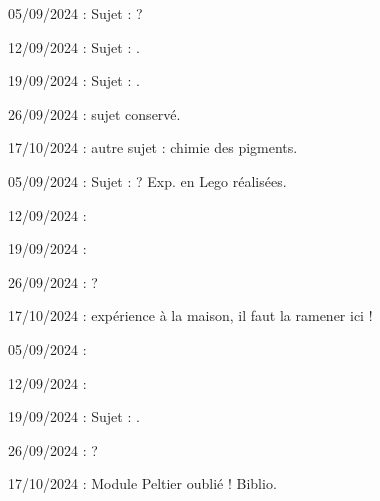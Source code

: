 \begin{liste}
  \item 05/09/2024 : Sujet :   ?
  \item 12/09/2024 : Sujet : .
  \item 19/09/2024 : Sujet : .
  \item 26/09/2024 : sujet conservé.
  \item 17/10/2024 : autre sujet : chimie des pigments.
\end{liste}

\begin{liste}
  \item 05/09/2024 : Sujet :   ? Exp. en Lego réalisées.
  \item 12/09/2024 : 
  \item 19/09/2024 : 
  \item 26/09/2024 : ?
  \item 17/10/2024 : expérience à la maison, il faut la ramener ici !
\end{liste}

\begin{liste}
  \item 05/09/2024 : 
  \item 12/09/2024 : 
  \item 19/09/2024 : Sujet : .
  \item 26/09/2024 :  ?
  \item 17/10/2024 : Module Peltier oublié ! Biblio.
\end{liste}

